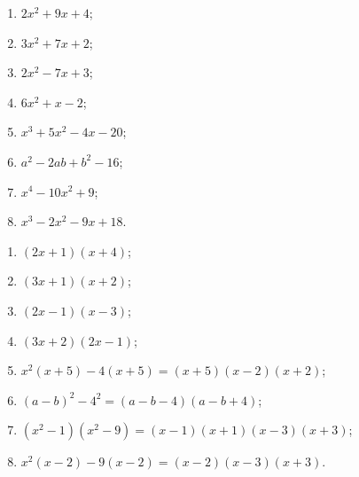 \documentclass[11pt,a4paper]{article}
\begin{document}
\begin{zadaniReseniBox}[breakable=false,title={Domácí úkol}]
\begin{enumerate}[label=\alph*)]
\item $2x^2+9x+4$;
\item $3x^2+7x+2$;
\item $2x^2-7x+3$;
\item $6x^2+x-2$;
\item $x^3+5x^2-4x-20$;
\item $a^2-2ab+b^2-16$;
\item $x^4-10x^2+9$;
\item $x^3-2x^2-9x+18$.
\end{enumerate}
\tcblower
\begin{enumerate}[label=\alph*)]
\item $(2x+1)(x+4)$;
\item $(3x+1)(x+2)$;
\item $(2x-1)(x-3)$;
\item $(3x+2)(2x-1)$;
\item $x^2(x+5)-4(x+5)=(x+5)(x-2)(x+2)$;
\item $(a-b)^2-4^2=(a-b-4)(a-b+4)$;
\item $(x^2-1)(x^2-9)=(x-1)(x+1)(x-3)(x+3)$;
\item $x^2(x-2)-9(x-2)=(x-2)(x-3)(x+3)$.
\end{enumerate}
\end{zadaniReseniBox}
\end{document}
